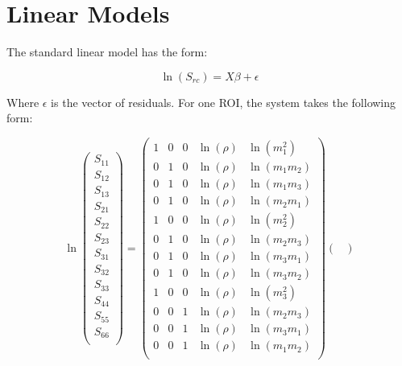 \documentclass[a4paper,fleqn]{DC_ArtStyle}
\begin{document}
\appendix
\section{Linear Models}\label{A1}

The standard linear model has the form:

\begin{equation}
	\ln(S_{rc}) = X \beta + \epsilon
\end{equation}

Where $\epsilon$ is the vector of residuals. For one ROI, the system takes the following form:

\begin{equation}
	\ln
	\begin{pmatrix}
		S_{11} \\
		S_{12} \\
		S_{13} \\
		S_{21} \\
		S_{22} \\
		S_{23} \\
		S_{31} \\
		S_{32} \\
		S_{33} \\
		S_{44} \\
		S_{55} \\
		S_{66} \\
	\end{pmatrix} = \begin{pmatrix}
		1 & 0 & 0 & \ln(\rho) & \ln(m_1^2) \\
		0 & 1 & 0 & \ln(\rho) & \ln(m_1 m_2) \\
		0 & 1 & 0 & \ln(\rho) & \ln(m_1 m_3) \\
		0 & 1 & 0 & \ln(\rho) & \ln(m_2 m_1) \\
		1 & 0 & 0 & \ln(\rho) & \ln(m_2^2) \\
		0 & 1 & 0 & \ln(\rho) & \ln(m_2 m_3) \\
		0 & 1 & 0 & \ln(\rho) & \ln(m_3 m_1) \\
		0 & 1 & 0 & \ln(\rho) & \ln(m_3 m_2) \\
		1 & 0 & 0 & \ln(\rho) & \ln(m_3^2) \\
		0 & 0 & 1 & \ln(\rho) & \ln(m_2 m_3) \\
		0 & 0 & 1 & \ln(\rho) & \ln(m_3 m_1) \\
		0 & 0 & 1 & \ln(\rho) & \ln(m_1 m_2) \\
	\end{pmatrix} \begin{pmatrix}

\end{pmatrix}
\end{equation}
\end{document}
